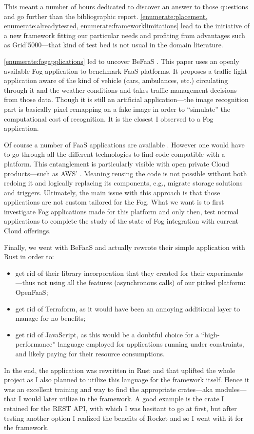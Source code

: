 This meant a number of hours dedicated to discover an answer to those questions and go further than the bibliographic report. \cref{enumerate:placement, enumerate:alreadytested, enumerate:frameworklimitations} lead to the initiative of a new framework fitting our particular needs and profiting from advantages such as Grid'5000—that kind of test bed is not usual in the domain literature.

\cref{enumerate:fogapplications} led to uncover BeFaaS \cite{grambow_befaas_2021}. This paper uses an openly available Fog application to benchmark \gls{FaaS} platforms. It proposes a traffic light application aware of the kind of vehicle (cars, ambulances, etc.) circulating through it and the weather conditions and takes traffic management decisions from those data. Though it is still an artificial application—the image recognition part is basically pixel remapping on a fake image in order to “simulate” the computational cost of recognition. It is the closest I observed to a Fog application.

Of course a number of \gls{FaaS} applications are available \cite{eskandani_wonderless_2021}. However one would have to go through all the different technologies to find code compatible with a platform. This entanglement is particularly visible with open private Cloud products—such as AWS' \cite{tarneberg_experiences_2016,eismann_state_2021}. Meaning reusing the code is not possible without both redoing it and logically replacing its components, e.g., migrate storage solutions and triggers. Ultimately, the main issue with this approach is that those applications are not custom tailored for the Fog. What we want is to first investigate Fog applications made for this platform and only then, test normal applications to complete the study of the state of Fog integration with current Cloud offerings.

Finally, we went with BeFaaS \cite{grambow_befaas_2021} and actually rewrote their simple application with Rust in order to:
\begin{itemize}
	\item get rid of their library incorporation that they created for their experiments—thus not using all the features (asynchronous calls) of our picked platform: OpenFaaS;
	\item get rid of Terraform, as it would have been an annoying additional layer to manage for no benefits;
	\item get rid of JavaScript, as this would be a doubtful choice for a “high-performance” language employed for applications running under constraints, and likely paying for their resource consumptions.
\end{itemize}
In the end, the application was rewritten in Rust and that uplifted the whole project as I also planned to utilize this language for the framework itself. Hence it was an excellent training and way to find the appropriate crates—aka modules—that I would later utilize in the framework. A good example is the crate I retained for the \gls{REST} \gls{API}, with which I was hesitant to go at first, but after testing another option I realized the benefits of Rocket \cite{benitez_rocket_2022} and so I went with it for the framework.

